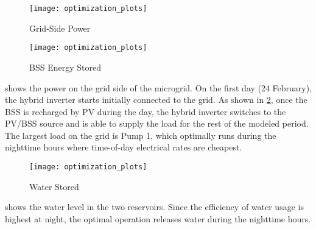 \begin{figure}[t]
	\centering
	\texttt{[image: optimization\_plots]}
	\caption{Grid-Side Power}
	\label{fig:grid-side-power}
\end{figure}

\begin{figure}[t]
	\centering
	\texttt{[image: optimization\_plots]}
	\caption{BSS Energy Stored}
	\label{fig:bss-energy}
\end{figure}

 shows the power on the grid side of the microgrid.
On the first day (24 February), the hybrid inverter starts initially connected to the grid.
As shown in \cref{fig:bss-energy}, once the BSS is recharged by PV during the day, the hybrid inverter switches to the PV/BSS source and is able to supply the load for the rest of the modeled period.
The largest load on the grid is Pump 1, which optimally runs during the nighttime hours where time-of-day electrical rates are cheapest.


%


\begin{figure}[t]
	\centering
	\texttt{[image: optimization\_plots]}
	\caption{Water Stored}
	\label{fig:water-level}
\end{figure}


 shows the water level in the two reservoirs.
Since the efficiency of water usage is highest at night, the optimal operation releases water during the nighttime hours.


